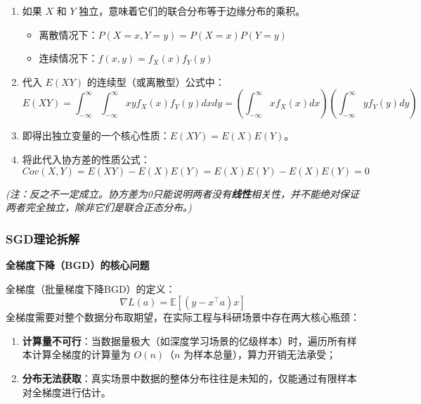 \documentclass[10pt]{article}
\numberwithin{equation}{section}
\theoremstyle{plain}
\theoremstyle{definition}
\theoremstyle{remark}
\begin{document}
\begin{AnalysisBox}[定理证明逻辑与推导]
\begin{enumerate}[label=\arabic*., leftmargin=*]
    \item 如果 $X$ 和 $Y$ 独立，意味着它们的联合分布等于边缘分布的乘积。
    \begin{itemize}[leftmargin=*,nosep]
        \item 离散情况下：$\displaystyle P(X=x, Y=y) = P(X=x)P(Y=y)$
        \item 连续情况下：$\displaystyle f(x,y) = f_X(x)f_Y(y)$
    \end{itemize}
    \item 代入 $E(XY)$ 的连续型（或离散型）公式中：
    \[ \displaystyle E(XY) = \int_{-\infty}^{\infty} \int_{-\infty}^{\infty} xy f_X(x)f_Y(y) dx dy = \left( \int_{-\infty}^{\infty} x f_X(x) dx \right) \left( \int_{-\infty}^{\infty} y f_Y(y) dy \right) \]
    \item 即得出独立变量的一个核心性质：\textbf{$E(XY) = E(X)E(Y)$}。
    \item 将此代入协方差的性质公式：
    \[ \displaystyle Cov(X, Y) = E(XY) - E(X)E(Y) = E(X)E(Y) - E(X)E(Y) = 0 \]
\end{enumerate}
\end{AnalysisBox}
\textit{(注：反之不一定成立。协方差为0只能说明两者没有\textbf{线性}相关性，并不能绝对保证两者完全独立，除非它们是联合正态分布。)}



\subsubsection{SGD理论拆解}

{\par\vspace{1ex}\noindent\large\bfseries\color{brandD} 全梯度下降（BGD）的核心问题\par}\par\vspace{0.5ex}
全梯度（批量梯度下降BGD）的定义：
\[ \displaystyle \nabla L(a) = \mathbb{E}\left[(y - x^\top a)x\right] \]
全梯度需要对整个数据分布取期望，在实际工程与科研场景中存在两大核心瓶颈：
\begin{enumerate}[label=\arabic*., leftmargin=*]
    \item \textbf{计算量不可行}：当数据量极大（如深度学习场景的亿级样本）时，遍历所有样本计算全梯度的计算量为 $O(n)$（$n$ 为样本总量），算力开销无法承受；
    \item \textbf{分布无法获取}：真实场景中数据的整体分布往往是未知的，仅能通过有限样本对全梯度进行估计。
\end{enumerate}
\end{document}
